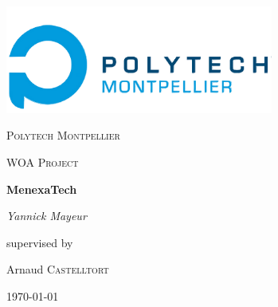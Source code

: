 \begin{titlepage}
	\centering
	\includegraphics[width=0.66\textwidth]{src/logoPolytech.png}\par\vspace{1cm}
	{\scshape\LARGE Polytech Montpellier\par}
	\vspace{1cm}
	{\scshape\Large WOA Project\par}
	\vspace{1.5cm}
	{\huge\bfseries MenexaTech\par}
	\vspace{2cm}
	{\Large\itshape Yannick Mayeur\par}
	\vfill
	supervised by\par
	Arnaud \textsc{Castelltort}

	\vfill

	{\large \today\par}
\end{titlepage}
